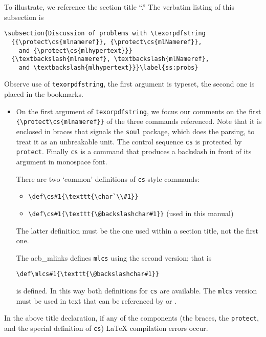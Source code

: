 \documentclass{article}
\makeatletter
\def\amtIndent{15pt}
\let\pkg\textsf
\let\opt\texttt
\def\cs#1{\texttt{\@backslashchar#1}}
\makeatother
\begin{document}
To illustrate, we reference the section title ``.'' The verbatim listing of this subsection is
\begin{Verbatim}[xleftmargin=\amtIndent,fontsize=\small,commandchars=!()]
\subsection{Discussion of problems with \texorpdfstring
  {{\protect\cs{mlnameref}}, {\protect\cs{mlNameref}},
    and {\protect\cs{mlhypertext}}}
  {\textbackslash{mlnameref}, \textbackslash{mlNameref},
    and \textbackslash{mlhypertext}}}\label{ss:probs}
\end{Verbatim}
Observe use of \cs{texorpdfstring}, the first argument is typeset, the second
one is placed in the bookmarks.
\begin{itemize}
  \item On the first argument of \cs{texorpdfstring}, we focus our comments
      on the first \verb~{\protect\cs{mlnameref}}~ of the three commands
      referenced. Note that it is enclosed in braces that signals the
      \opt{soul} package, which does the parsing, to treat it as an
      unbreakable unit. The control sequence \cs{cs} is protected by
      \cs{protect}. Finally \cs{cs} is a command that produces a backslash in
      front of its argument in monospace font.

      There are two `common' definitions of \cs{cs}-style commands:
      \begin{itemize}
        \item \verb~\def\cs#1{\texttt{\char`\\#1}}~
        \item \verb~\def\cs#1{\texttt{\@backslashchar#1}}~ (used in this manual)
      \end{itemize}
      The latter definition must be the one used within a section title, not the first one.

      The \pkg{aeb\_mlinks} defines \cs{mlcs} using the second version; that
      is \begin{flushleft}\hskip\amtIndent\verb~\def\mlcs#1{\texttt{\@backslashchar#1}}~\end{flushleft} is defined. In
      this way both definitions for \cs{cs} are available. The \cs{mlcs}
      version must be used in text that can be referenced by 
      or .
\end{itemize}
In the above title declaration, if any of the components (the braces, the \cs{protect}, and the special
definition of \cs{cs}) {\LaTeX} compilation errors occur.
\end{document}
